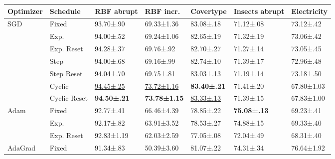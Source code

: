 \documentclass[letterpaper]{article} %
\begin{document}
\begin{table}[t]
	\centering
	\small
	\begin{tabular}{lllllll}
		\toprule
		Optimizer                & Schedule     & RBF abrupt            & RBF incr.              & Covertype             & Insects abrupt       & Electricity          \\
		\midrule
		\multirow[c]{7}{*}{SGD}  & Fixed        & 93.70±.90             & 69.33±1.36             & 83.08±.18             & 71.12±.08            & 73.12±.42            \\
		                         & Exp.         & 94.00±.52             & 69.24±1.06             & 82.65±.19             & 71.32±.19            & 73.06±.42            \\
		                         & Exp. Reset   & 94.28±.37             & 69.76±.92              & 82.70±.27             & 71.27±.14            & 73.05±.45            \\
		                         & Step         & 94.00±.68             & 69.16±.99              & 82.74±.10             & 71.39±.17            & 72.96±.48            \\
		                         & Step Reset   & 94.04±.70             & 69.75±.81              & 83.03±.13             & 71.19±.14            & 73.18±.50            \\
		                         & Cyclic       & \underline{94.45±.25} & \underline{73.72±1.16} & \bfseries{83.40±.21}  & 71.41±.20            & 67.80±1.03           \\
		                         & Cyclic Reset & \bfseries{94.50±.21}  & \bfseries{73.78±1.15}  & \underline{83.33±.13} & 71.39±.15            & 67.83±1.00           \\ \midrule
		\multirow[c]{3}{*}{Adam} & Fixed        & 92.77±.41             & 66.46±4.39             & 78.85±.22             & \bfseries{75.08±.13} & 69.23±.41            \\
		                         & Exp.         & 92.17±.82             & 63.91±3.52             & 78.53±.27             & 74.88±.15            & 69.33±.40            \\
		                         & Exp. Reset   & 92.83±1.19            & 62.03±2.59             & 77.05±.08             & 72.04±.49            & 68.31±.40            \\
		\midrule
		AdaGrad                  & Fixed        & 91.34±.83             & 50.39±3.60             & 81.07±.22             & 74.31±.34            & 76.64±1.92           \\

\end{tabular}
\end{table}
\end{document}
